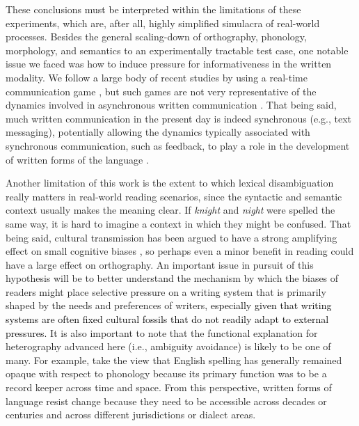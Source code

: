\documentclass[doc,biblatex]{apa7}
\newcommand\newmaterial[1]{\textcolor{black}{#1}}
\begin{document}
These conclusions must be interpreted within the limitations of these experiments, which are, after all, highly simplified simulacra of real-world processes. Besides the general scaling-down of orthography, phonology, morphology, and semantics to an experimentally tractable test case, one notable issue we faced was how to induce pressure for informativeness in the written modality. We follow a large body of recent studies by using a real-time communication game \parencite[e.g.,][]{Carr:2017, Kanwal:2017, Kirby:2015, Raviv:2018, Saldana:2019, Silvey:2019, Winters:2015}, but such games are not very representative of the dynamics involved in asynchronous written communication \parencite[although see][for some approaches]{Winters:2019}. That being said, much written communication in the present day is indeed synchronous (e.g., text messaging), potentially allowing the dynamics typically associated with synchronous communication, such as feedback, to play a role in the development of written forms of the language \parencite{Lupyan:2016}.

Another limitation of this work is the extent to which lexical disambiguation really matters in real-world reading scenarios, since the syntactic and semantic context usually makes the meaning clear. If \textit{knight} and \textit{night} were spelled the same way, it is hard to imagine a context in which they might be confused. That being said, cultural transmission has been argued to have a strong amplifying effect on small cognitive biases \parencite{Thompson:2016}, so perhaps even a minor benefit in reading could have a large effect on orthography. An important issue in pursuit of this hypothesis will be to better understand the mechanism by which the biases of readers might place selective pressure on a writing system that is primarily shaped by the needs and preferences of writers, \newmaterial{especially given that writing systems are often fixed cultural fossils that do not readily adapt to external pressures.} It is also important to note that the functional explanation for heterography advanced here (i.e., ambiguity avoidance) is likely to be one of many. For example, \textcite{Stenroos:2016} take the view that English spelling has generally remained opaque with respect to phonology because its primary function was to be a record keeper across time and space. From this perspective, written forms of language resist change because they need to be accessible across decades or centuries and across different jurisdictions or dialect areas.
\end{document}
